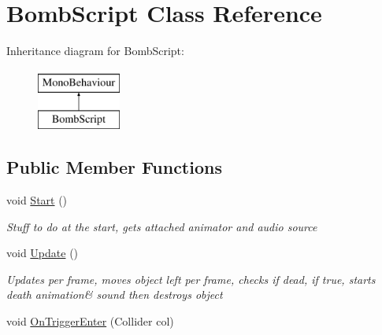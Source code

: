 \hypertarget{classBombScript}{\section{Bomb\-Script Class Reference}
\label{classBombScript}
}
Inheritance diagram for Bomb\-Script\-:\begin{figure}[H]
\begin{center}
\leavevmode
\includegraphics[height=2.000000cm]{classBombScript}
\end{center}
\end{figure}
\subsection*{Public Member Functions}
\begin{DoxyCompactItemize}
\item 
void \hyperlink{classBombScript_af805ef6d3e038e1e677bddd4013d790e}{Start} ()
\begin{DoxyCompactList}\small\item\em Stuff to do at the start, gets attached animator and audio source \end{DoxyCompactList}\item 
void \hyperlink{classBombScript_ac503477a92904905bd3940a5f88dae7b}{Update} ()
\begin{DoxyCompactList}\small\item\em Updates per frame, moves object left per frame, checks if dead, if true, starts death animation\& sound then destroys object \end{DoxyCompactList}\item 
void \hyperlink{classBombScript_ad2919ec2099dd9b523c9f19e8331cb89}{On\-Trigger\-Enter} (Collider col)
\end{DoxyCompactItemize}
